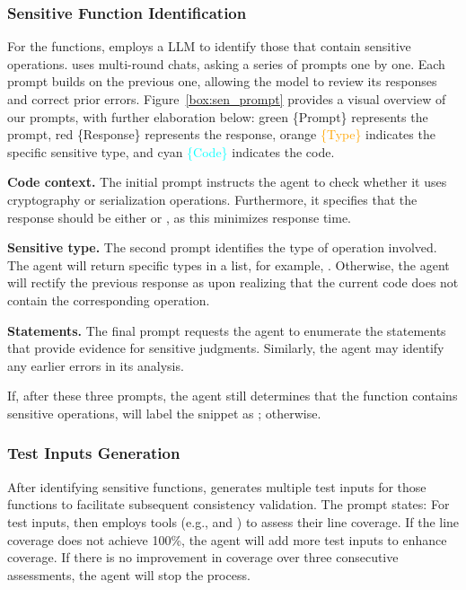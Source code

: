 \subsubsection{Sensitive Function Identification}
For the functions, \system employs a LLM to identify those that contain sensitive operations.
\system uses multi-round chats, asking a series of prompts one by one.
Each prompt builds on the previous one, allowing the model to review its responses and correct prior errors.
Figure~\ref{box:sen_prompt} provides a visual overview of our prompts, with further elaboration below: green \textcolor{green!60!black}{\{Prompt\}} represents the prompt, red \textcolor{red!80!black}{\{Response\}} represents the response, orange \textcolor{orange}{\{Type\}} indicates the specific sensitive type, and cyan \textcolor{cyan}{\{Code\}} indicates the code.


\begin{description}[leftmargin = 0pt]
    \item [Prompt 1:] \textbf{Code context.} 
    The initial prompt instructs the agent to check whether it uses cryptography or serialization operations.
    Furthermore, it specifies that the response should be either  or , as this minimizes response time.

    \item [Prompt 2:] \textbf{Sensitive type.} 
    The second prompt identifies the type of operation involved.
    The agent will return specific types in a list, for example, .
    Otherwise, the agent will rectify the previous response as  upon realizing that the current code does not contain the corresponding operation. 
    
    \item [Prompt 3:] \textbf{Statements.}
    The final prompt requests the agent to enumerate the statements that provide evidence for sensitive judgments. 
    Similarly, the agent may identify any earlier errors in its analysis.
\end{description}
If, after these three prompts, the agent still determines that the function contains sensitive operations, \system will label the snippet as ;  otherwise.

\subsubsection{Test Inputs Generation}
After identifying sensitive functions, \system generates multiple test inputs for those functions to facilitate subsequent consistency validation.
The prompt states: 
For test inputs, \system then employs tools (e.g.,  and ) to assess their line coverage. 
If the line coverage does not achieve 100\%, the agent will add more test inputs to enhance coverage. 
If there is no improvement in coverage over three consecutive assessments, the agent will stop the process.

